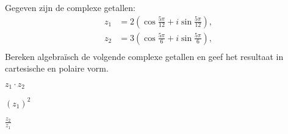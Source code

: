 \documentclass{ximera}
\begin{document}
\begin{exercise}
    Gegeven zijn de complexe getallen:
\begin{align*}
    z_1 &= 2 \left(\cos\frac{5\pi}{12} + i \sin\frac{5\pi}{12}\right), \\
    z_2 &= 3 \left(\cos\frac{5\pi}{6}+ i \sin\frac{5\pi}{6}\right), \\
\end{align*}
Bereken algebraïsch de volgende complexe getallen en geef het resultaat in cartesische en polaire vorm.

    \begin{question} $z_1 \cdot z_2$    \end{question}
    \begin{question} $(z_1)^2$          \end{question}
    \begin{question} $\frac{z_2}{z_1}$  \end{question}
  
\end{exercise}
\end{document}
